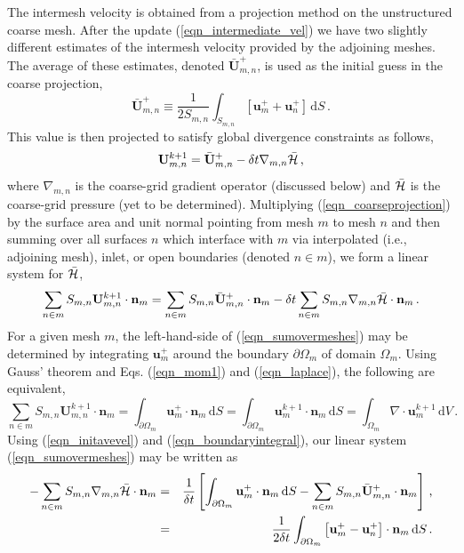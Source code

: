 \documentclass[11pt]{book}
\begin{document}
The intermesh velocity is obtained from a projection method on the unstructured coarse mesh.  After the update (\ref{eqn_intermediate_vel}) we have two slightly different estimates of the intermesh velocity provided by the adjoining meshes.  The average of these estimates, denoted $\bar{\mathbf{U}}^+_{m,n}$, is used as the initial guess in the coarse projection,
\begin{equation}
\label{eqn_initavevel}
\bar{\mathbf{U}}^+_{m,n} \equiv \frac{1}{2 S_{m,n}} \int_{S_{m,n}} \left[\mathbf{u}_{m}^+ + \mathbf{u}_{n}^+ \right] \,\mbox{d} S \,\mbox{.}
\end{equation}
This value is then projected to satisfy global divergence constraints as follows,
\begin{equation}
\label{eqn_coarseprojection}
\mathbf{U}^{k+1}_{m,n} = \bar{\mathbf{U}}^+_{m,n} - \delta t \nabla_{m,n}\bar{{\cal H}} \,\mbox{,}
\end{equation}
where $\nabla_{m,n}$ is the coarse-grid gradient operator (discussed below) and $\bar{{\cal H}}$ is the coarse-grid pressure (yet to be determined). Multiplying (\ref{eqn_coarseprojection}) by the surface area and unit normal pointing from mesh $m$ to mesh $n$ and then summing over all surfaces $n$ which interface with $m$ via interpolated (i.e., adjoining mesh), inlet, or open boundaries (denoted $n \in m$), we form a linear system for $\bar{{\cal H}}$,
\begin{equation}
\label{eqn_sumovermeshes}
\sum_{n\in m} S_{m,n} \mathbf{U}^{k+1}_{m,n} \cdot \mathbf{n}_{m} = \sum_{n\in m} S_{m,n} \bar{\mathbf{U}}^+_{m,n} \cdot \mathbf{n}_{m} - \delta t \sum_{n\in m} S_{m,n} \nabla_{m,n}\bar{{\cal H}} \cdot \mathbf{n}_{m} \,\mbox{.}
\end{equation}
For a given mesh $m$, the left-hand-side of (\ref{eqn_sumovermeshes}) may be determined by integrating $\mathbf{u}^+_{m}$ around the boundary $\partial \Omega_{m}$ of domain $\Omega_m$.  Using Gauss' theorem and Eqs. (\ref{eqn_mom1}) and (\ref{eqn_laplace}), the following are equivalent,
\begin{equation}
\label{eqn_boundaryintegral}
\sum_{n\in m} S_{m,n} \mathbf{U}^{k+1}_{m,n} \cdot \mathbf{n}_{m} = \int_{\partial \Omega_{m}}\mathbf{u}^+_{m} \cdot \mathbf{n}_m \,\mbox{d}S  = \int_{\partial \Omega_{m}}\mathbf{u}^{k+1}_{m} \cdot \mathbf{n}_m \,\mbox{d}S = \int_{\Omega_{m}} \nabla\cdot\mathbf{u}^{k+1}_{m} \,\mbox{d}V \,\mbox{.}
\end{equation}
Using (\ref{eqn_initavevel}) and (\ref{eqn_boundaryintegral}), our linear system (\ref{eqn_sumovermeshes}) may be written as
\begin{eqnarray}
\label{eqn_linsystem1}
- \sum_{n\in m} S_{m,n} \nabla_{m,n}\bar{{\cal H}} \cdot \mathbf{n}_{m} &=& \frac{1}{\delta t} \left[ \int_{\partial \Omega_{m}}\mathbf{u}^+_{m} \cdot \mathbf{n}_m \,\mbox{d}S - \sum_{n\in m} S_{m,n} \bar{\mathbf{U}}^+_{m,n} \cdot \mathbf{n}_{m} \right] \,\mbox{,} \\
\label{eqn_linsystem2}
&=& \frac{1}{2 \delta t} \int_{\partial \Omega_{m}} \left[ \mathbf{u}^+_m - \mathbf{u}^+_n \right] \cdot \mathbf{n}_{m} \,\mbox{d}S \,\mbox{.}
\end{eqnarray}
\end{document}
